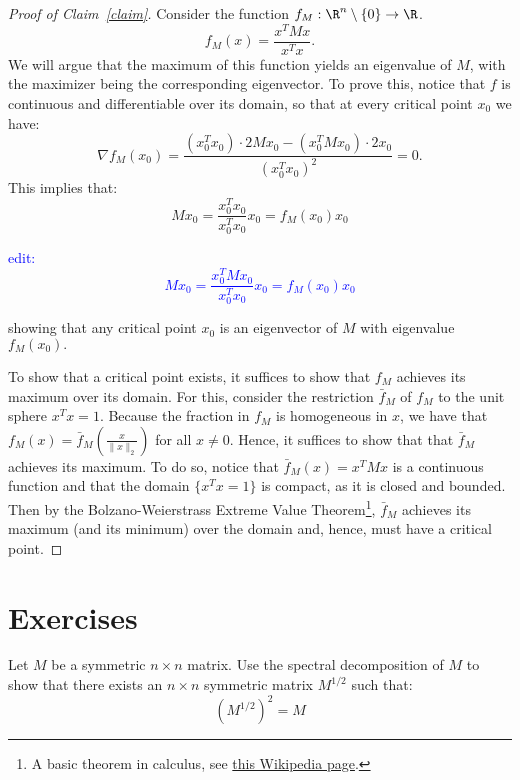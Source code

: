 \begin{proof}[Proof of Claim~\ref{claim}]
Consider the function $f_M: \R^n \setminus\{0\}\to \R$.
$$
f_M(x) = \frac{x^T M x}{x^T x}.
$$
We will argue that the maximum of this function yields an eigenvalue of $M$, with the maximizer being the corresponding eigenvector. To prove this, notice that $f$ is continuous and differentiable over its domain, so that at every critical point $x_0$ we have:
$$
\nabla f_M(x_0) = \frac{(x_0^T x_0) \cdot 2M x_0 - (x_0^T M x_0) \cdot 2x_0}{(x_0^T x_0)^2} = 0.
$$
This implies that:
$$
M x_0 = \frac{x_0^T x_0}{x_0^T x_0} x_0 = f_M(x_0) x_0
$$

\textcolor{blue}{edit: $$
M x_0 = \frac{x_0^T M x_0}{x_0^T x_0} x_0 = f_M(x_0) x_0
$$}


showing that any critical point $x_0$ is an eigenvector of $M$ with eigenvalue $f_M(x_0).$

To show that a critical point exists, it suffices to show that $f_M$ achieves its maximum over its domain. For this, consider the restriction $\bar{f}_M$ of $f_M$ to the unit sphere $x^Tx=1.$
Because the fraction in $f_M$ is homogeneous in $x$, we have that $f_M(x) = \bar{f}_M(\frac{x}{\|x\|_2})$ for all $x \neq 0.$ Hence, it suffices to show that that $\bar{f}_M$ achieves its maximum.
To do so, notice that $\bar{f}_M(x) = x^T M x$ is a continuous function and that the domain $\{x^Tx = 1\}$ is compact, as it is closed and bounded. Then by the Bolzano-Weierstrass Extreme Value Theorem\footnote{A basic theorem in calculus, see \href{https://en.wikipedia.org/wiki/Extreme_value_theorem}{this Wikipedia page}.}, $\bar{f}_M$ achieves its maximum (and its minimum) over the domain and, hence, must have a critical point.
\end{proof}
\section{Exercises}
\begin{exercise}
Let $M$ be a symmetric $n\times n$ matrix. Use the spectral decomposition of $M$ to show that there exists an $n \times n$ symmetric matrix $M^{1/2}$ such that:
\[
	\left(M^{1/2}\right)^2 = M
\]
\end{exercise}